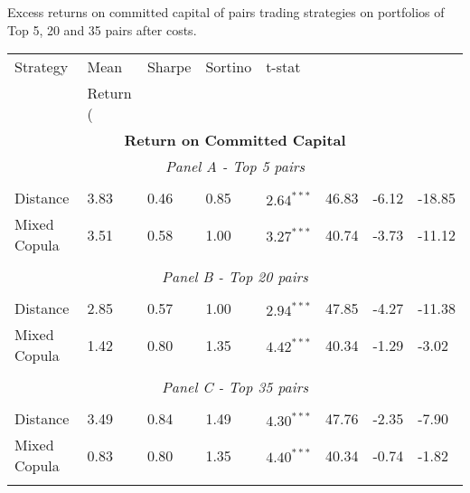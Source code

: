 \documentclass[a4paper]{article}
\begin{document}
	\begin{threeparttable}[H]
		\centering \tiny
		\caption{Excess returns on committed capital of pairs trading strategies on portfolios of Top 5, 20 and 35 pairs after costs. }
		\begin{tabularx}{\textwidth}{@{\extracolsep{\fill}}llllllll@{}}
			\toprule
			Strategy & Mean  & Sharpe & Sortino & t-stat & \\%
			& Return (\\%
			\midrule
			\multicolumn{8}{c}{\textbf{Return on Committed Capital}} \\
			\multicolumn{8}{c}{\textit{Panel A - Top 5 pairs}} \\
			&       &       &       &       &       &       &  \\
			Distance &  3.83  & 0.46  & 0.85  & $2.64^{***}$  & 46.83 & -6.12    & -18.85 \\
			Mixed Copula & 3.51  &  0.58  & 1.00  &  $3.27^{***}$  &  40.74 &  -3.73  &  -11.12 \\
			\multicolumn{1}{r}{} & \multicolumn{1}{r}{} & \multicolumn{1}{r}{} & \multicolumn{1}{r}{} & \multicolumn{1}{r}{} & \multicolumn{1}{r}{} & \multicolumn{1}{r}{} & \multicolumn{1}{r}{} \\
			\multicolumn{8}{c}{\textit{Panel B - Top 20 pairs}} \\
			&       &       &       &       &       &       &  \\
			Distance &  2.85  & 0.57  & 1.00  & $ 2.94^{***}$  & 47.85 & -4.27  & -11.38 \\
			Mixed Copula  & 1.42  &  0.80  & 1.35  & $4.42^{***}$  & 40.34  & -1.29  & -3.02  \\
			\multicolumn{1}{r}{} & \multicolumn{1}{r}{} & \multicolumn{1}{r}{} & \multicolumn{1}{r}{} & \multicolumn{1}{r}{} & \multicolumn{1}{r}{} & \multicolumn{1}{r}{} & \multicolumn{1}{r}{} \\
			\multicolumn{8}{c}{\textit{Panel C - Top 35 pairs}} \\
			&       &       &       &       &       &       &  \\
			Distance &  3.49  &   0.84  & 1.49  & $4.30^{***}$  & 47.76 & -2.35  & -7.90 \\
			Mixed Copula & 0.83  & 0.80  & 1.35  & $4.40^{***}$  & 40.34 & -0.74  & -1.82  \\
			\multicolumn{1}{r}{} & \multicolumn{1}{r}{} & \multicolumn{1}{r}{} & \multicolumn{1}{r}{} & \multicolumn{1}{r}{} & \multicolumn{1}{r}{} & \multicolumn{1}{r}{} & \multicolumn{1}{r}{} \\

\end{tabularx}
\end{threeparttable}
\end{document}
